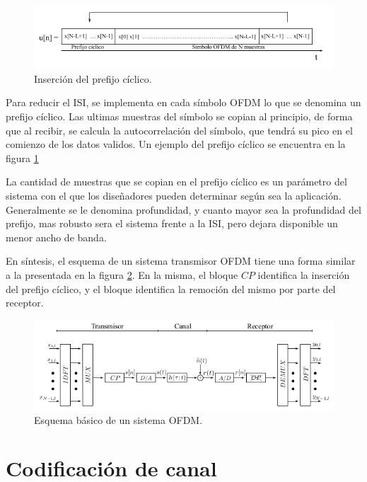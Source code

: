 \begin{figure}[h!]
	\centering
	\includegraphics[scale=0.65]{figuras/cap03/prefijo_ciclico}
	\caption{\label{f:prefijo_ciclico} Inserción del prefijo cíclico.}
\end{figure}

Para reducir el ISI, se implementa en cada símbolo OFDM lo que se denomina un prefijo cíclico. Las ultimas muestras del símbolo se copian al principio, de forma que al recibir, se calcula la autocorrelación del símbolo, que tendrá su pico en el comienzo de los datos validos. Un ejemplo del prefijo cíclico se encuentra en la figura \ref{f:prefijo_ciclico}

La cantidad de muestras que se copian en el prefijo cíclico es un parámetro del sistema con el que los diseñadores pueden determinar según sea la aplicación. Generalmente se le denomina profundidad, y cuanto mayor sea la profundidad del prefijo, mas robusto sera el sistema frente a la ISI, pero dejara disponible un menor ancho de banda.

En síntesis, el esquema de un sistema transmisor OFDM tiene una forma similar a la presentada en la figura \ref{f:ofdm_system}. En la misma, el bloque $CP$ identifica la inserción del prefijo cíclico, y el bloque  identifica la remoción del mismo por parte del receptor.

\begin{figure}[h!]
	\centering
	\includegraphics[scale=0.65]{figuras/cap02/ofdm_system}
	\caption{\label{f:ofdm_system} Esquema básico de un sistema OFDM.}
\end{figure}

\section{Codificación de canal}

